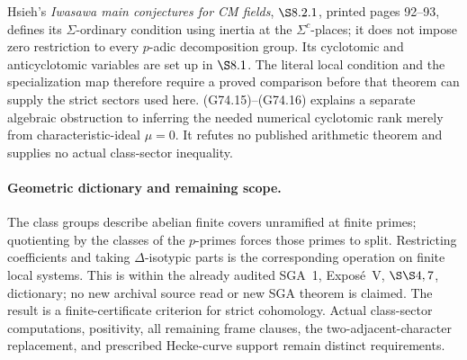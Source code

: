 Hsieh's \emph{Iwasawa main conjectures for CM fields},
\(\S8.2.1\), printed pages 92--93, defines its
\(\Sigma\)-ordinary condition using inertia at the
\(\Sigma^c\)-places; it does not impose zero restriction to every
\(p\)-adic decomposition group.  Its cyclotomic and
anticyclotomic variables are set up in \(\S8.1\).
The literal local condition and the specialization map therefore
require a proved comparison before that theorem can supply the
strict sectors used here.  (G74.15)--(G74.16) explains a separate
algebraic obstruction to inferring the needed numerical
cyclotomic rank merely from characteristic-ideal \(\mu=0\).
It refutes no published arithmetic theorem and supplies no
actual class-sector inequality.

\paragraph{Geometric dictionary and remaining scope.}
The class groups describe abelian finite covers unramified at
finite primes; quotienting by the classes of the \(p\)-primes
forces those primes to split.  Restricting coefficients and
taking \(\Delta\)-isotypic parts is the corresponding operation
on finite local systems.  This is within the already audited
SGA~1, Expos\'e~V, \(\S\S4,7\), dictionary; no new archival
source read or new SGA theorem is claimed.
The result is a finite-certificate criterion for strict
cohomology.  Actual class-sector computations, positivity,
all remaining frame clauses, the two-adjacent-character
replacement, and prescribed Hecke-curve support remain distinct
requirements.


